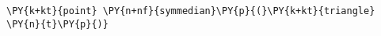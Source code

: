 \begin{Verbatim}[commandchars=\\\{\}]
    \PY{k+kt}{point} \PY{n+nf}{symmedian}\PY{p}{(}\PY{k+kt}{triangle} \PY{n}{t}\PY{p}{)}
\end{Verbatim}
